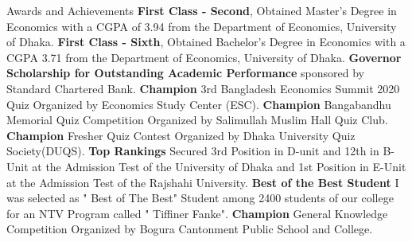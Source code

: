 \begin{rubric}{Awards and Achievements}
\entry*[2024] \textbf{First Class - Second}, Obtained Master's Degree in Economics with a CGPA of 3.94 from the Department of Economics, University of Dhaka.
%
\entry*[2023] \textbf{First Class - Sixth}, Obtained Bachelor's Degree in Economics with a CGPA  3.71 from the Department of Economics, University of Dhaka.
%
\entry*[2022] \textbf{Governor Scholarship for Outstanding Academic Performance} sponsored by Standard Chartered Bank.
\entry*[2020] \textbf{ Champion} 3rd Bangladesh Economics Summit 2020 Quiz Organized by Economics Study Center (ESC).
\entry*[2019] \textbf{ Champion} Bangabandhu Memorial Quiz Competition Organized by Salimullah Muslim Hall Quiz Club.
\entry*[2018] \textbf{ Champion} Fresher Quiz Contest Organized by Dhaka University Quiz Society(DUQS).
\entry*[2017] \textbf{ Top Rankings } Secured 3rd Position in D-unit and 12th in B-Unit at the Admission Test of the University of Dhaka and 1st Position in E-Unit at the Admission Test of the Rajshahi University.
\entry*[2017] \textbf{ Best of the Best Student } I was selected as " Best of The Best" Student among 2400 students of our college for an NTV Program called " Tiffiner Fanke".
\entry*[2016] \textbf{ Champion} General Knowledge Competition Organized by Bogura Cantonment Public School and College.

\end{rubric}